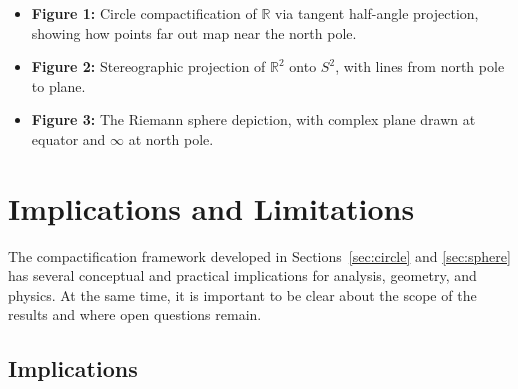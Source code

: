 \documentclass[12pt]{article}
\theoremstyle{remark}
\begin{document}
\begin{itemize}
    \item \textbf{Figure 1:} Circle compactification of $\mathbb{R}$ via tangent 
    half-angle projection, showing how points far out map near the north pole.  
    \item \textbf{Figure 2:} Stereographic projection of $\mathbb{R}^2$ onto $S^2$, 
    with lines from north pole to plane.  
    \item \textbf{Figure 3:} The Riemann sphere depiction, with complex plane drawn 
    at equator and $\infty$ at north pole.  
\end{itemize}

\section{Implications and Limitations}
\label{sec:discussion}

The compactification framework developed in Sections~\ref{sec:circle} and 
\ref{sec:sphere} has several conceptual and practical implications for analysis, 
geometry, and physics. At the same time, it is important to be clear about the 
scope of the results and where open questions remain.

\subsection{Implications}
\end{document}
